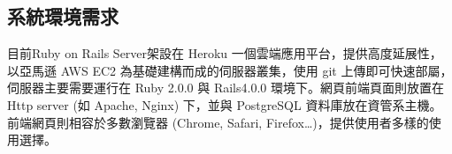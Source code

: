 \documentclass[11pt]{article}
\begin{document}
\subsection{系統環境需求}
目前Ruby on Rails Server架設在 Heroku 一個雲端應用平台，提供高度延展性，以亞馬遜 AWS EC2 為基礎建構而成的伺服器叢集，使用 git 上傳即可快速部屬，伺服器主要需要運行在 Ruby 2.0.0 與 Rails4.0.0 環境下。網頁前端頁面則放置在 Http server (如 Apache, Nginx) 下，並與 PostgreSQL 資料庫放在資管系主機。前端網頁則相容於多數瀏覽器 (Chrome, Safari, Firefox…)，提供使用者多樣的使用選擇。
\end{document}
